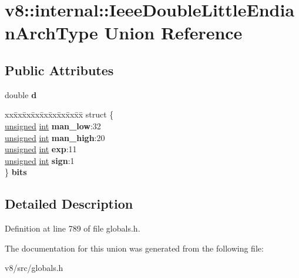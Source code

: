 \hypertarget{unionv8_1_1internal_1_1IeeeDoubleLittleEndianArchType}{}\section{v8\+:\+:internal\+:\+:Ieee\+Double\+Little\+Endian\+Arch\+Type Union Reference}
\label{unionv8_1_1internal_1_1IeeeDoubleLittleEndianArchType}
\subsection*{Public Attributes}
\begin{DoxyCompactItemize}
\item 
\mbox{\label{unionv8_1_1internal_1_1IeeeDoubleLittleEndianArchType_aae1ea6412f669875160955735ed06f43}} 
double {\bfseries d}
\item 
\mbox{\label{unionv8_1_1internal_1_1IeeeDoubleLittleEndianArchType_afd0e8a8d2ec55b6c6af41d0f41ce6be8}} 
\begin{tabbing}
xx\=xx\=xx\=xx\=xx\=xx\=xx\=xx\=xx\=\kill
struct \{\\
\>\mbox{\hyperlink{classunsigned}{unsigned}} \mbox{\hyperlink{classint}{int}} {\bfseries man\_low}:32\\
\>\mbox{\hyperlink{classunsigned}{unsigned}} \mbox{\hyperlink{classint}{int}} {\bfseries man\_high}:20\\
\>\mbox{\hyperlink{classunsigned}{unsigned}} \mbox{\hyperlink{classint}{int}} {\bfseries exp}:11\\
\>\mbox{\hyperlink{classunsigned}{unsigned}} \mbox{\hyperlink{classint}{int}} {\bfseries sign}:1\\
\} {\bfseries bits}\\

\end{tabbing}\end{DoxyCompactItemize}


\subsection{Detailed Description}


Definition at line 789 of file globals.\+h.



The documentation for this union was generated from the following file\+:\begin{DoxyCompactItemize}
\item 
v8/src/globals.\+h\end{DoxyCompactItemize}
